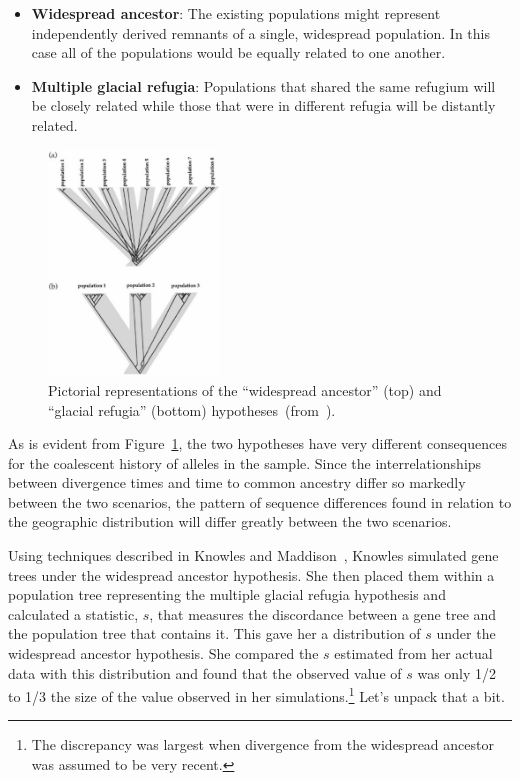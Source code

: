 \begin{itemize}

\item {\bf Widespread ancestor}: The existing populations might represent
  independently derived remnants of a single, widespread
  population. In this case all of the populations would be equally
  related to one another.

\item {\bf Multiple glacial refugia}: Populations that shared the same
  refugium will be closely related while those that were in different
  refugia will be distantly related.

\end{itemize}

\begin{figure}
\begin{center}
\includegraphics[height=6cm]{divergence-hypotheses.eps}
\end{center}
\caption{Pictorial representations of the ``widespread ancestor''
  (top) and ``glacial refugia'' (bottom)
  hypotheses~(from~\cite{Knowles-2001}).}\label{fig:divergence-hypotheses}
\end{figure}

As is evident from Figure~\ref{fig:divergence-hypotheses}, the two
hypotheses have very different consequences for the coalescent history
of alleles in the sample. Since the interrelationships between
divergence times and time to common ancestry differ so markedly
between the two scenarios, the pattern of sequence differences found
in relation to the geographic distribution will differ greatly between
the two scenarios. 

Using techniques described in Knowles and
Maddison~\cite{Knowles-Maddison-2002}, Knowles simulated gene trees
under the widespread ancestor hypothesis. She then placed them within
a population tree representing the multiple glacial refugia hypothesis
and calculated a statistic, $s$, that measures the discordance between
a gene tree and the population tree that contains it. This gave her a
distribution of $s$ under the widespread ancestor hypothesis. She
compared the $s$ estimated from her actual data with this distribution
and found that the observed value of $s$ was only 1/2 to 1/3 the size
of the value observed in her simulations.\footnote{The discrepancy was
  largest when divergence from the widespread ancestor was assumed to
  be very recent.} Let's unpack that a bit. 

